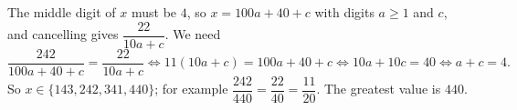 The middle digit of $x$ must be $4$, so $x=100a+40+c$ with digits $a\ge1$ and $c$, and cancelling gives $\dfrac{22}{10a+c}$. We need
\[
\dfrac{242}{100a+40+c}=\dfrac{22}{10a+c}\iff 11(10a+c)=100a+40+c\iff 10a+10c=40\iff a+c=4 .
\]
So $x\in\{143,242,341,440\}$; for example $\dfrac{242}{440}=\dfrac{22}{40}=\dfrac{11}{20}$. The greatest value is $\boxed{440}$.
